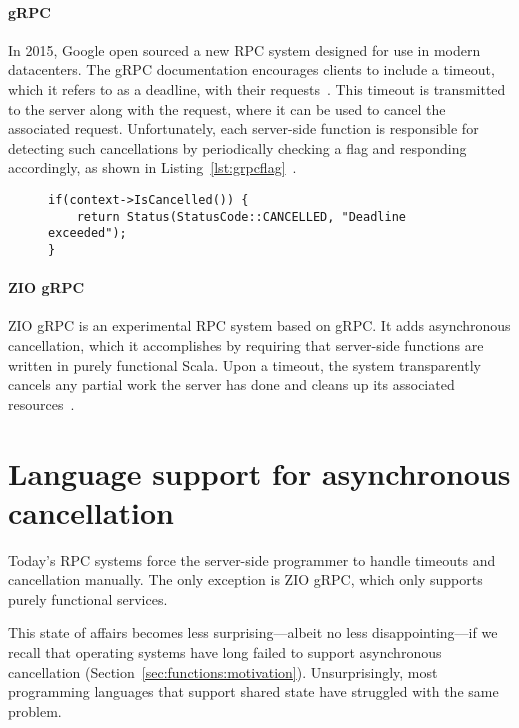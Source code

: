 \paragraph{gRPC}
In 2015, Google open sourced a new RPC system designed for use in modern datacenters.
The gRPC documentation encourages clients to include a timeout, which it refers to as
a deadline, with their requests~\cite{www-grpc}.  This timeout is transmitted to the
server along with the request, where it can be used to cancel the associated request.
Unfortunately, each server-side function is responsible for detecting such
cancellations by periodically checking a flag and responding accordingly, as shown in
Listing~\ref{lst:grpcflag}~\cite{www-grpc-deadlines}.

\begin{figure}
\begin{lstlisting}[label=lst:grpcflag,caption=Checking the cancellation flag in a gRPC server-side function]
if(context->IsCancelled()) {
	return Status(StatusCode::CANCELLED, "Deadline exceeded");
}
\end{lstlisting}
\end{figure}

\paragraph{ZIO gRPC}
ZIO gRPC is an experimental RPC system based on gRPC.  It adds asynchronous
cancellation, which it accomplishes by requiring that server-side functions are
written in purely functional Scala.  Upon a timeout, the system transparently cancels
any partial work the server has done and cleans up its associated
resources~\cite{www-zio-grpc}.


\section{Language support for asynchronous cancellation}
\label{sec:strobelight:cancellation}

Today's RPC systems force the server-side programmer to handle timeouts and
cancellation manually.  The only exception is ZIO gRPC, which only supports purely
functional services.

This state of affairs becomes less surprising---albeit no less disappointing---if we
recall that operating systems have long failed to support asynchronous cancellation
(Section~\ref{sec:functions:motivation}).  Unsurprisingly, most programming languages
that support shared state have struggled with the same problem.


